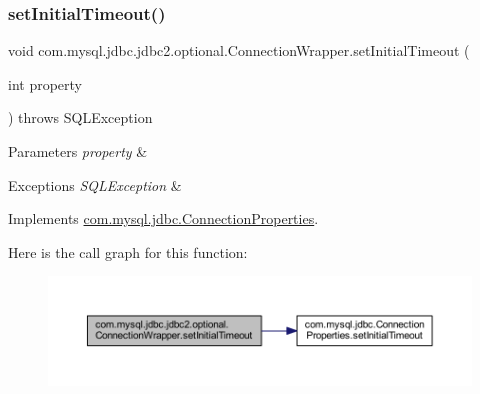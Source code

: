 \subsubsection{\texorpdfstring{set\+Initial\+Timeout()}{setInitialTimeout()}}
{\footnotesize\ttfamily void com.\+mysql.\+jdbc.\+jdbc2.\+optional.\+Connection\+Wrapper.\+set\+Initial\+Timeout (\begin{DoxyParamCaption}\item[{int}]{property }\end{DoxyParamCaption}) throws S\+Q\+L\+Exception}


\begin{DoxyParams}{Parameters}
{\em property} & \\
\hline
\end{DoxyParams}

\begin{DoxyExceptions}{Exceptions}
{\em S\+Q\+L\+Exception} & \\
\hline
\end{DoxyExceptions}


Implements \mbox{\hyperlink{interfacecom_1_1mysql_1_1jdbc_1_1_connection_properties_aaf6a88938cc10d9607cbcba5f3ac75a2}{com.\+mysql.\+jdbc.\+Connection\+Properties}}.

Here is the call graph for this function\+:
\nopagebreak
\begin{figure}[H]
\begin{center}
\leavevmode
\includegraphics[width=350pt]{classcom_1_1mysql_1_1jdbc_1_1jdbc2_1_1optional_1_1_connection_wrapper_af88d96aed55dd2fdd401b0d86dcc700d_cgraph}
\end{center}
\end{figure}
\mbox{\label{classcom_1_1mysql_1_1jdbc_1_1jdbc2_1_1optional_1_1_connection_wrapper_a62fdb1de695db692ac572889bc2299c8}} 
